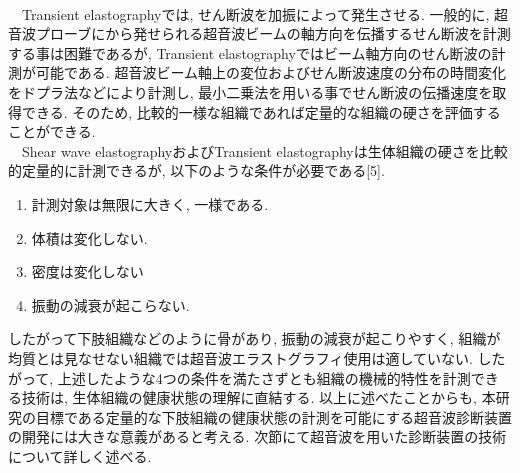 \\\ \ Transient elastographyでは, せん断波を加振によって発生させる. 一般的に, 超音波プローブにから発せられる超音波ビームの軸方向を伝播するせん断波を計測する事は困難であるが, Transient elastographyではビーム軸方向のせん断波の計測が可能である. 超音波ビーム軸上の変位およびせん断波速度の分布の時間変化をドプラ法などにより計測し, 最小二乗法を用いる事でせん断波の伝播速度を取得できる. そのため, 比較的一様な組織であれば定量的な組織の硬さを評価することができる. 
\\\ \ Shear wave elastographyおよびTransient elastographyは生体組織の硬さを比較的定量的に計測できるが, 以下のような条件が必要である[5].
\begin{enumerate}
   \item 計測対象は無限に大きく, 一様である.
   \item 体積は変化しない. 
   \item 密度は変化しない
   \item 振動の減衰が起こらない. 
\end{enumerate}
したがって下肢組織などのように骨があり, 振動の減衰が起こりやすく, 組織が均質とは見なせない組織では超音波エラストグラフィ使用は適していない. したがって, 上述したような4つの条件を満たさずとも組織の機械的特性を計測できる技術は, 生体組織の健康状態の理解に直結する. 以上に述べたことからも, 本研究の目標である定量的な下肢組織の健康状態の計測を可能にする超音波診断装置の開発には大きな意義があると考える. 次節にて超音波を用いた診断装置の技術について詳しく述べる. 

